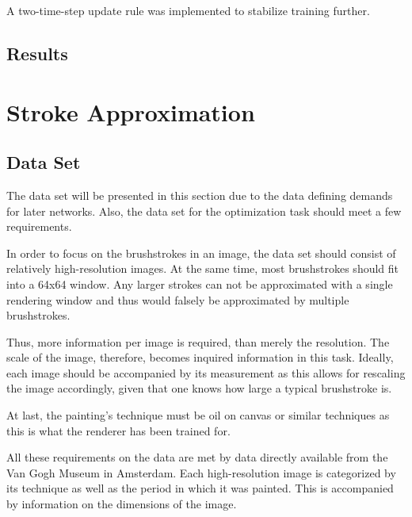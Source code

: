 A two-time-step update rule was implemented to stabilize training further.

\subsection{Results}


\section{Stroke Approximation}

\subsection{Data Set}
The data set will be presented in this section due to the data defining demands for later networks.
Also, the data set for the optimization task should meet a few requirements.

In order to focus on the brushstrokes in an image, the data set should consist of relatively high-resolution images.
At the same time, most brushstrokes should fit into a 64x64 window.
Any larger strokes can not be approximated with a single rendering window and thus would falsely be approximated by multiple brushstrokes.

Thus, more information per image is required, than merely the resolution.
The scale of the image, therefore, becomes inquired information in this task.
Ideally, each image should be accompanied by its measurement as this allows for rescaling the image accordingly, given that one knows how large a typical brushstroke is.

At last, the painting's technique must be oil on canvas or similar techniques as this is what the renderer has been trained for.

All these requirements on the data are met by data directly available from the Van Gogh Museum in Amsterdam.
Each high-resolution image is categorized by its technique as well as the period in which it was painted.
This is accompanied by information on the dimensions of the image.

